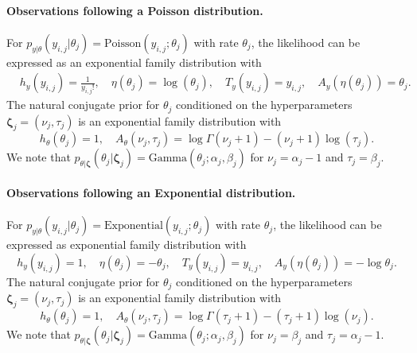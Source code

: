 \paragraph{Observations following a Poisson distribution.} 
For $p_{{y}\vert{\theta}}({y}_{i,j} \vert {\theta}_j) = \text{Poisson}({y}_{i,j};{\theta}_j)$ with rate $\theta_j$, the likelihood can be expressed as an exponential family distribution with
\begin{align*}
&h_{{y}}({y}_{i,j}) =  \frac{1}{y_{i,j}!},\quad
{\eta}({\theta}_j) = \log(\theta_j),\quad {T}_{{y}}({y}_{i,j}) = y_{i,j}, \quad
{A}_{{y}}({\eta}({\theta}_j)) = \theta_j.
\end{align*}
The natural conjugate prior for ${\theta}_j$ conditioned on the hyperparameters $\boldsymbol{\zeta}_j = (\nu_j, \tau_j)$ is an exponential family distribution with
\begin{equation*} 
h_{{\theta}}({\theta}_j) = 1, \quad A_{\theta}({\nu}_j, {\tau}_j) = \log \Gamma(\nu_j + 1) - (\nu_j+1)\log(\tau_j).
\end{equation*}
We note that $p_{\theta\vert \boldsymbol{\zeta}}(\theta_j\vert \boldsymbol{\zeta}_j)= \text{Gamma}(\theta_j;\alpha_j,\beta_j)$ for $\nu_j=\alpha_j-1$ and $\tau_j=\beta_j$.

\paragraph{Observations following an Exponential distribution.}
For $p_{{y}\vert{\theta}}({y}_{i,j} \vert {\theta}_j) = \text{Exponential}({y}_{i,j};{\theta}_j)$ with rate $\theta_j$, the likelihood can be expressed as exponential family distribution with
\begin{equation*}
h_y({y}_{i,j}) = 1,\quad \eta(\theta_j) = -\theta_j,\quad T_y({y}_{i,j}) = {y}_{i,j},\quad {A}_{{y}}({\eta}({\theta}_j)) = - \log \theta_j.
\end{equation*}
The natural conjugate prior for ${\theta}_j$ conditioned on the hyperparameters $\boldsymbol{\zeta}_j = (\nu_j, \tau_j)$ is an exponential family distribution with 
\begin{equation*}
h_{{\theta}}({\theta}_j) = 1, \quad A_{\theta}({\nu}_j, {\tau}_j) = \log \Gamma(\tau_j + 1) - (\tau_j+1)\log(\nu_j).
\end{equation*}
We note that $p_{\theta\vert \boldsymbol{\zeta}}(\theta_j\vert \boldsymbol{\zeta}_j)= \text{Gamma}(\theta_j;\alpha_j,\beta_j)$ for $\nu_j=\beta_j$ and $\tau_j= \alpha_j-1$.

